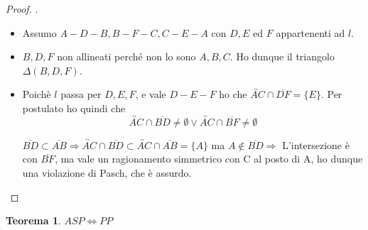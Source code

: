 \documentclass[a4paper,10pt]{article}
\theoremstyle{definition}
\theoremstyle{indentdefinition}
\theoremstyle{indentpostulate}
\theoremstyle{indenttheorem}
\newtheorem{thm}{Teorema}[section]
\theoremstyle{myremark}
\theoremstyle{indentgeneral}
\newenvironment{myboxed} 
{\noindent\begin{lrbox}{\mybox}\begin{minipage}{\textwidth}}
{\end{minipage}\end{lrbox}\fbox{\usebox{\mybox}}}
\begin{document}
\begin{proof}  .
\begin{itemize}
    \item Assumo $A-D-B,B-F-C,C-E-A$ con $D,E$ ed $F$ appartenenti ad $l$. 
    \item $B,D,F$ non allineati perché non lo sono $A,B,C$. Ho dunque il triangolo $\Delta (B,D,F)$. 
    \item Poichè $l$ passa per $D,E,F$, e vale $D-E-F$ ho che $\overleftrightarrow{AC} \cap \overline{DF}=\{ E \}$. Per postulato  ho quindi che $$\overleftrightarrow{AC} \cap \overline{BD} \neq \emptyset \lor \overleftrightarrow{AC} \cap \overline{BF} \neq \emptyset$$ 
    
$\overline{BD} \subset \overline{AB} \Rightarrow \overleftrightarrow{AC} \cap \overline{BD} \subset \overleftrightarrow{AC} \cap \overline{AB}=\{ A \}$ ma $A \not \in \overline{BD} \Rightarrow$ L'intersezione è con $\overline{BF}$, ma vale un ragionamento simmetrico con C al posto di A, ho dunque una violazione di Pasch, che è assurdo. \lightning
\end{itemize}    \end{proof} 

\begin{myboxed}
\begin{thm}  $ASP \iff PP$    \end{thm} 
\end{myboxed}
\end{document}
